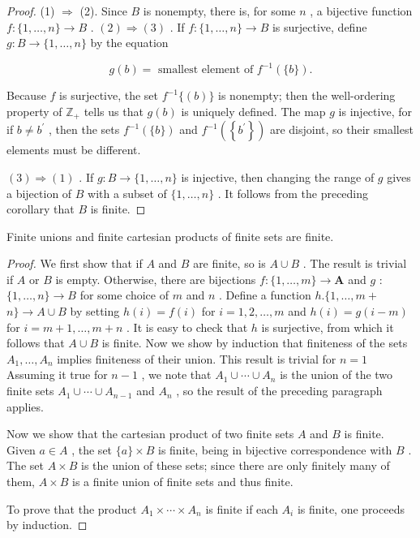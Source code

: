 \begin{proof}(1) \(\Rightarrow\) (2). Since \(B\) is nonempty, there is, for some \(n\) , a bijective function \(f : \{ 1,\ldots ,n\}  \rightarrow  B\) .
\(\left( 2\right)  \Rightarrow  \left( 3\right)\) . If \(f : \{ 1,\ldots ,n\}  \rightarrow  B\) is surjective, define \(g : B \rightarrow  \{ 1,\ldots ,n\}\) by the equation

\[
g\left( b\right)  = \text{ smallest element of }{f}^{-1}\left( {\{ b\} }\right) .
\]

Because \(f\) is surjective, the set \({f}^{-1}\{ \left( b\right) \}\) is nonempty; then the well-ordering property of \({\mathbb{Z}}_{ + }\) tells us that \(g\left( b\right)\) is uniquely defined. The map \(g\) is injective, for if \(b \neq  {b}^{\prime }\) , then the sets \({f}^{-1}\left( {\{ b\} }\right)\) and \({f}^{-1}\left( \left\{  {b}^{\prime }\right\}  \right)\) are disjoint, so their smallest elements must be different.

\(\left( 3\right)  \Rightarrow  \left( 1\right)\) . If \(g : B \rightarrow  \{ 1,\ldots ,n\}\) is injective, then changing the range of \(g\) gives a bijection of \(B\) with a subset of \(\{ 1,\ldots ,n\}\) . It follows from the preceding corollary that \(B\) is finite.
\end{proof}
\begin{corollary} Finite unions and finite cartesian products of finite sets are finite.
\end{corollary}

\begin{proof}We first show that if \(A\) and \(B\) are finite, so is \(A \cup  B\) . The result is trivial if \(A\) or \(B\) is empty. Otherwise, there are bijections \(f : \{ 1,\ldots ,m\}  \rightarrow  \mathbf{A}\) and \(g\) : \(\{ 1,\ldots ,n\}  \rightarrow  B\) for some choice of \(m\) and \(n\) . Define a function \(h.\{ 1,\ldots ,m +\)  \(n\}  \rightarrow  A \cup  B\) by setting \(h\left( i\right)  = f\left( i\right)\) for \(i = 1,2,\ldots ,m\) and \(h\left( i\right)  = g\left( {i - m}\right)\) for \(i = m + 1,\ldots ,m + n\) . It is easy to check that \(h\) is surjective, from which it follows that \(A \cup  B\) is finite.
Now we show by induction that finiteness of the sets \({A}_{1},\ldots ,{A}_{n}\) implies finiteness of their union. This result is trivial for \(n = 1\) Assuming it true for \(n - 1\) , we note that \({A}_{1} \cup  \cdots  \cup  {A}_{n}\) is the union of the two finite sets \({A}_{1} \cup  \cdots  \cup  {A}_{n - 1}\) and \({A}_{n}\) , so the result of the preceding paragraph applies.

Now we show that the cartesian product of two finite sets \(A\) and \(B\) is finite. Given \(a \in  A\) , the set \(\{ a\}  \times  B\) is finite, being in bijective correspondence with \(B\) . The set \(A \times  B\) is the union of these sets; since there are only finitely many of them, \(A \times  B\) is a finite union of finite sets and thus finite.

To prove that the product \({A}_{1} \times  \cdots  \times  {A}_{n}\) is finite if each \({A}_{i}\) is finite, one proceeds by induction.
\end{proof}
